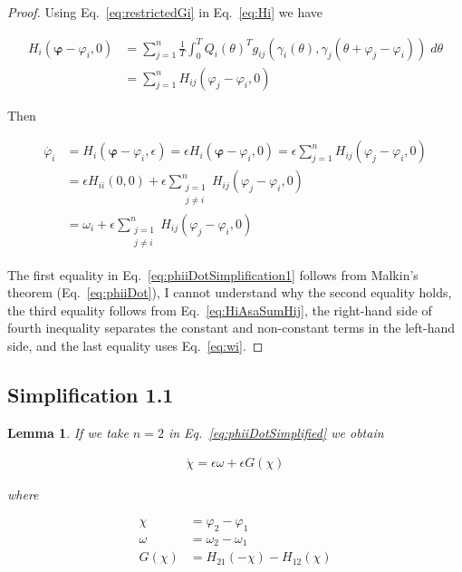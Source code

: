 \documentclass{article}
\newtheorem{simplification1.1}{Lemma}
\begin{document}
\begin{proof}
\noindent Using Eq.~\ref{eq:restrictedGi} in Eq.~\ref{eq:Hi} we have

\begin{align}
H_i(\bm{\varphi}-\varphi_i,0)&=\sum_{j=1}^n\frac{1}{T}\int_0^TQ_i(\theta)^Tg_{ij}(\gamma_i(\theta),\gamma_j(\theta+\varphi_j-\varphi_i))\;d\theta\nonumber\\
&=\sum_{j=1}^nH_{ij}(\varphi_j-\varphi_i,0)
\label{eq:HiAsaSumHij}
\end{align}

\noindent Then 

\begin{align}
\dot{\varphi_i}&=H_i(\bm{\varphi}-\varphi_i,\epsilon)=\epsilon
H_i(\bm{\varphi}-\varphi_i,0)=\epsilon\sum_{j=1}^nH_{ij}(\varphi_j-\varphi_i,0)\nonumber\\
&=\epsilon H_{ii}(0,0)+\epsilon\sum_{\substack{j=1\\j\neq i}}^n
H_{ij}(\varphi_j-\varphi_i,0)\nonumber\\
&=\omega_i+\epsilon\sum_{\substack{j=1\\j\neq i}}^n H_{ij}(\varphi_j-\varphi_i,0)
\label{eq:phiiDotSimplification1}
\end{align}

The first equality in Eq.~\ref{eq:phiiDotSimplification1} follows from
Malkin's theorem (Eq.~\ref{eq:phiiDot}), 
%
I cannot understand why the second equality holds, 
%
the third equality follows from Eq.~\ref{eq:HiAsaSumHij}, the right-hand
side of fourth inequality separates the constant and non-constant terms in the
left-hand side, and the last equality uses Eq.~\ref{eq:wi}.

\end{proof}

\subsection*{Simplification 1.1}

\begin{simplification1.1}
If we take $n=2$ in Eq.~\ref{eq:phiiDotSimplified} we obtain

\begin{align}
\dot{\chi}=\epsilon\omega+\epsilon G(\chi)
\label{eq:chiDot}
\end{align}

\noindent where

\begin{align}
\chi&=\varphi_2-\varphi_1\label{eq:chi}\\
\omega&=\omega_2-\omega_1\label{eq:omega}\\
G(\chi)&=H_{21}(-\chi)-H_{12}(\chi)\label{eq:G}
\end{align}

\end{simplification1.1}
\end{document}

